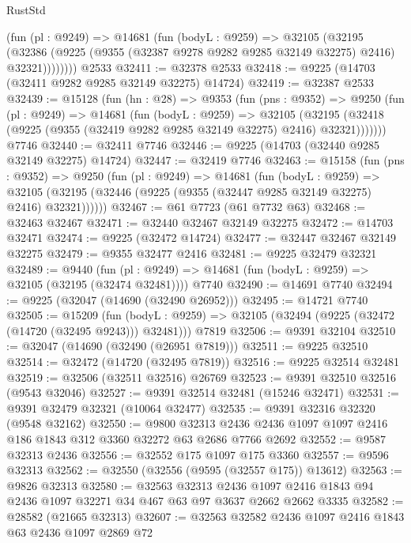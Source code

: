 \begin{lexlean}{RustStd}
\begin{coremodule}
          (fun (pl : @9249) =>
          @14681
            (fun (bodyL : @9259) =>
            @32105
              (@32195
                (@32386 (@9225 (@9355 (@32387 @9278 @9282 @9285 @32149 @32275) @2416) @32321))))))))
    @2533
@32411 := @32378 @2533
@32418 := @9225 (@14703 (@32411 @9282 @9285 @32149 @32275) @14724)
@32419 := @32387 @2533
@32439 := @15128
    (fun (hn : @28) =>
    @9353
      (fun (pns : @9352) =>
      @9250
        (fun (pl : @9249) =>
        @14681
          (fun (bodyL : @9259) =>
          @32105
            (@32195 (@32418 (@9225 (@9355 (@32419 @9282 @9285 @32149 @32275) @2416) @32321)))))))
    @7746
@32440 := @32411 @7746
@32446 := @9225 (@14703 (@32440 @9285 @32149 @32275) @14724)
@32447 := @32419 @7746
@32463 := @15158
    (fun (pns : @9352) =>
    @9250
      (fun (pl : @9249) =>
      @14681
        (fun (bodyL : @9259) =>
        @32105 (@32195 (@32446 (@9225 (@9355 (@32447 @9285 @32149 @32275) @2416) @32321))))))
@32467 := @61 @7723 (@61 @7732 @63)
@32468 := @32463 @32467
@32471 := @32440 @32467 @32149 @32275
@32472 := @14703 @32471
@32474 := @9225 (@32472 @14724)
@32477 := @32447 @32467 @32149 @32275
@32479 := @9355 @32477 @2416
@32481 := @9225 @32479 @32321
@32489 := @9440
    (fun (pl : @9249) => @14681 (fun (bodyL : @9259) => @32105 (@32195 (@32474 @32481))))
    @7740
@32490 := @14691 @7740
@32494 := @9225 (@32047 (@14690 (@32490 @26952)))
@32495 := @14721 @7740
@32505 := @15209
    (fun (bodyL : @9259) => @32105 (@32494 (@9225 (@32472 (@14720 (@32495 @9243))) @32481)))
    @7819
@32506 := @9391 @32104
@32510 := @32047 (@14690 (@32490 (@26951 @7819)))
@32511 := @9225 @32510
@32514 := @32472 (@14720 (@32495 @7819))
@32516 := @9225 @32514 @32481
@32519 := @32506 (@32511 @32516) @26769
@32523 := @9391 @32510 @32516 (@9543 @32046)
@32527 := @9391 @32514 @32481 (@15246 @32471)
@32531 := @9391 @32479 @32321 (@10064 @32477)
@32535 := @9391 @32316 @32320 (@9548 @32162)
@32550 := @9800
    @32313
    @2436
    @2436
    @1097
    @1097
    @2416
    @186
    @1843
    @312
    @3360
    @32272
    @63
    @2686
    @7766
    @2692
@32552 := @9587 @32313 @2436
@32556 := @32552 @175 @1097 @175 @3360
@32557 := @9596 @32313
@32562 := @32550 (@32556 (@9595 (@32557 @175)) @13612)
@32563 := @9826 @32313
@32580 := @32563
    @32313
    @2436
    @1097
    @2416
    @1843
    @94
    @2436
    @1097
    @32271
    @34
    @467
    @63
    @97
    @3637
    @2662
    @2662
    @3335
@32582 := @28582 (@21665 @32313)
@32607 := @32563
    @32582
    @2436
    @1097
    @2416
    @1843
    @63
    @2436
    @1097
    @2869
    @72

\end{coremodule}
\end{lexlean}
